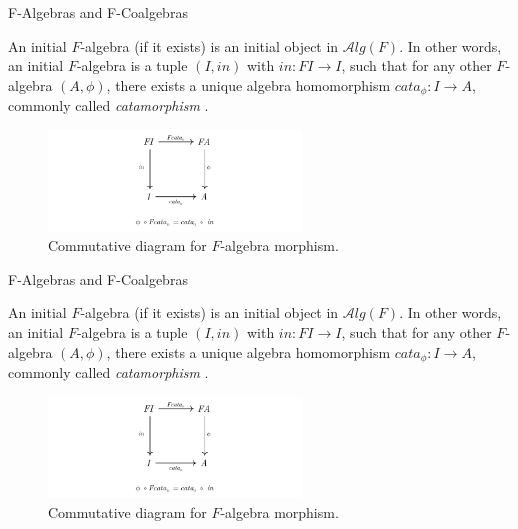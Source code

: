 \documentclass[aspectratio=169,xcolor=dvipsnames,10pt]{beamer}
\theoremstyle{definition}
\begin{document}
\begin{frame}[fragile]{F-Algebras and F-Coalgebras}
    \begin{definition}
        An initial $F$-algebra (if it exists) is an initial object in $\mathcal Alg(F)$.
        In other words, an initial $F$-algebra is a tuple $(I, in)$ with
        $in: F I \to I$, such that for any other $F$-algebra $(A, \phi)$,
        there exists a unique algebra homomorphism $cata_\phi: I \to A$,
        commonly called \textit{catamorphism} \citep{milewski2018category}.
    \end{definition}
    \begin{figure}[H]
        \begin{center}
            \includegraphics[width=0.6\textwidth]{../notebooks/cata.pdf}
        \end{center}
        \caption{Commutative diagram for $F$-algebra morphism.}
        \label{fig:falgebra}
    \end{figure}
\end{frame}

\begin{frame}[fragile]{F-Algebras and F-Coalgebras}
    \begin{definition}
        An initial $F$-algebra (if it exists) is an initial object in $\mathcal Alg(F)$.
        In other words, an initial $F$-algebra is a tuple $(I, in)$ with
        $in: F I \to I$, such that for any other $F$-algebra $(A, \phi)$,
        there exists a unique algebra homomorphism $cata_\phi: I \to A$,
        commonly called \textit{catamorphism} \citep{milewski2018category}.
    \end{definition}
    \begin{figure}[H]
        \begin{center}
            \includegraphics[width=0.6\textwidth]{../notebooks/cata.pdf}
        \end{center}
        \caption{Commutative diagram for $F$-algebra morphism.}
        \label{fig:falgebra}
    \end{figure}
\end{frame}
\end{document}
